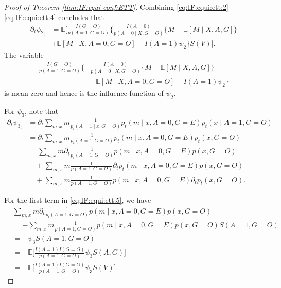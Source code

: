 \documentclass[10pt]{article}
\newcommand{\E}{\mathbb{E}}
\begin{document}
\begin{proof}[Proof of Theorem \ref{thm:IF:equi-conf:ETT}]
Combining \eqref{eq:IF:equi:ett:2}-\eqref{eq:IF:equi:ett:4} concludes that
\begin{align*}
\partial_t\psi_{2_t} 
&=\E\Big[
\frac{I(G=O)}{p(A=1,G=O)}\Big\{
\frac{I(A=0)}{p(A=0\mid X,G=O)}\{M-\E[M\mid X,A,G]\}\\
&+\E[M\mid X,A=0,G=O]-I(A=1)\psi_2
\Big\}S(V)
\Big].	
\end{align*}
The variable
\begin{align*}
\frac{I(G=O)}{p(A=1,G=O)}\Big\{&
\frac{I(A=0)}{p(A=0\mid X,G=O)}\{M-\E[M\mid X,A,G]\}\\
&+\E[M\mid X,A=0,G=O]-I(A=1)\psi_2
\Big\}
\end{align*}
is mean zero and hence is the influence function of $\psi_2$.


For $\psi_3$, note that
\begin{equation}
\label{eq:IF:equi:ett:5}
\begin{aligned}
\partial_t\psi_{3_t} 
&=\partial_t \sum_{m,x} m\frac{1}{p_t(A=1\mid x,G=O)}p_t(m\mid x,A=0,G=E)p_t(x\mid A=1,G=O)\\
&=\partial_t \sum_{m,x} m\frac{1}{p_t(A=1,G=O)}p_t(m\mid x,A=0,G=E)p_t(x,G=O)\\
&= \sum_{m,x} m \partial_t\frac{1}{p_t(A=1,G=O)}p(m\mid x,A=0,G=E)p(x,G=O)\\
&\quad+\sum_{m,x} m \frac{1}{p(A=1,G=O)}\partial_t p_t(m\mid x,A=0,G=E)p(x,G=O)\\
&\quad+\sum_{m,x} m \frac{1}{p(A=1,G=O)}p(m\mid x,A=0,G=E)\partial_t p_t(x,G=O).
\end{aligned}
\end{equation}

For the first term in \eqref{eq:IF:equi:ett:5}, we have
\begin{equation}
\label{eq:IF:equi:ett:6}
\begin{aligned}
&\sum_{m,x} m \partial_t\frac{1}{p_t(A=1,G=O)}p(m\mid x,A=0,G=E)p(x,G=O)\\
&=-\sum_{m,x} m \frac{1}{p(A=1,G=O)}p(m\mid x,A=0,G=E)p(x,G=O)S(A=1,G=O)\\
&=-\psi_3S(A=1,G=O)\\
&=-\E\Big[\frac{I(A=1)I(G=O)}{p(A=1,G=O)}\psi_3S(A,G)\Big]\\
&=-\E\Big[\frac{I(A=1)I(G=O)}{p(A=1,G=O)}\psi_3S(V)\Big].
\end{aligned}
\end{equation}


\end{proof}
\end{document}
